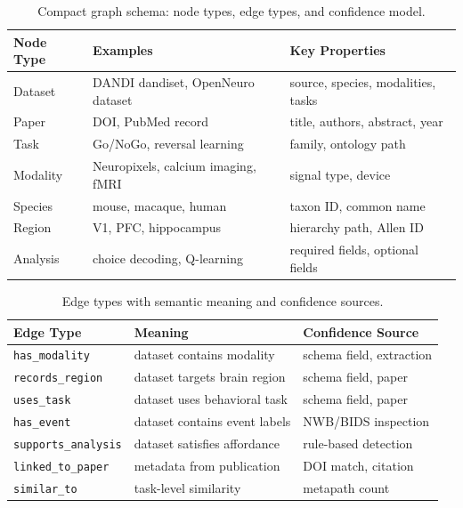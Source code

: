 \documentclass{article}
\theoremstyle{definition}
\begin{document}
\begin{table}[t]
\centering
\small
\caption{Compact graph schema: node types, edge types, and confidence model.}
\label{tab:graph-schema}
\begin{tabular}{llp{5cm}}
\toprule
\textbf{Node Type} & \textbf{Examples} & \textbf{Key Properties} \\
\midrule
Dataset & DANDI dandiset, OpenNeuro dataset & source, species, modalities, tasks \\
Paper & DOI, PubMed record & title, authors, abstract, year \\
Task & Go/NoGo, reversal learning & family, ontology path \\
Modality & Neuropixels, calcium imaging, fMRI & signal type, device \\
Species & mouse, macaque, human & taxon ID, common name \\
Region & V1, PFC, hippocampus & hierarchy path, Allen ID \\
Analysis & choice decoding, Q-learning & required fields, optional fields \\
\bottomrule
\end{tabular}
\end{table}

\begin{table}[t]
\centering
\small
\caption{Edge types with semantic meaning and confidence sources.}
\label{tab:edge-types}
\begin{tabular}{lp{4.5cm}l}
\toprule
\textbf{Edge Type} & \textbf{Meaning} & \textbf{Confidence Source} \\
\midrule
\texttt{has\_modality} & dataset contains modality & schema field, extraction \\
\texttt{records\_region} & dataset targets brain region & schema field, paper \\
\texttt{uses\_task} & dataset uses behavioral task & schema field, paper \\
\texttt{has\_event} & dataset contains event labels & NWB/BIDS inspection \\
\texttt{supports\_analysis} & dataset satisfies affordance & rule-based detection \\
\texttt{linked\_to\_paper} & metadata from publication & DOI match, citation \\
\texttt{similar\_to} & task-level similarity & metapath count \\
\bottomrule
\end{tabular}
\end{table}
\end{document}
